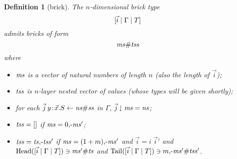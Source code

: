 \documentclass{article}
\newtheorem{defn}[thm]{Definition}
\begin{document}
\begin{defn}[brick]
The $n$-dimensional brick type
\[
  [\vec i \;|\; \Gamma \;|\; T]
\]
admits bricks of form
\[\mathit{ms}\#\mathit{tss}
\]
where
\begin{itemize}
\item $\mathit{ms}$ is a vector of natural numbers of length $n$ (also the length of $\vec i$);
\item $\mathit{tss}$ is $n$-layer nested vector of values (whose types will be given shortly);
\item for each $\vec j\: y\!:\!\vec x.S\leftarrow \mathit{ns}\#\mathit{ss}$ in $\Gamma$, $\vec j\downharpoonleft\mathit{ms} = \mathit{ns}$;
\item $\mathit{tss} = []$ if $\mathit{ms} = 0\mbox{$,\!\textrm{-}$}\mathit{ms}'$;
\item $\mathit{tss} = \mathit{ts}\mbox{$,\!\textrm{-}$}\mathit{tss}'$ if $\mathit{ms} = (1+m)\mbox{$,\!\textrm{-}$}\mathit{ms}'$ and $\vec i = i\:{\vec i}'$ and
  $\mathrm{Head}([\vec i \;|\; \Gamma \;|\; T]) \ni \mathit{ms}'\#\mathit{ts}$ and
  $\mathrm{Tail}([\vec i \;|\; \Gamma \;|\; T]) \ni m\mbox{$,\!\textrm{-}$}\mathit{ms}'\#\mathit{tss}'$.
\end{itemize}
\end{defn}
\end{document}
